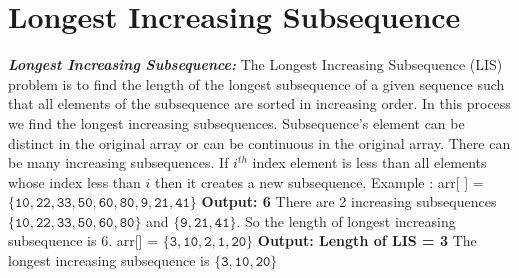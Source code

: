 \documentclass[12pt]{book}
\begin{document}
\section{Longest Increasing Subsequence}
\textbf{\textit{Longest Increasing Subsequence:}}
\newline\newline
The Longest Increasing Subsequence (LIS) problem is to find the length of the longest subsequence of a given sequence such that all elements of the subsequence are sorted in increasing order.\newline 
In this process we find the longest increasing subsequences. Subsequence’s element can be distinct in the original array or can be continuous in the original array. There can be many increasing subsequences. If $i^{th}$ index element is less than all elements whose index less than $i$ then it creates a new subsequence.\newline
Example :\newline
arr[ ] = $\mathtt{\{ 10, 22, 33, 50, 60, 80, 9, 21, 41\}}$\newline
	\textbf{Output: 6}\newline
		There are 2 increasing subsequences $\mathtt{\{ 10, 22, 33, 50, 60, 80\}}$  and $\mathtt{\{9, 21, 41\}}$. So the length of longest increasing subsequence is 6.\newline\newline 
	arr[] = $\mathtt{\{ 3, 10, 2, 1, 20 \}}$\newline
	\textbf{Output: Length of LIS = 3}\newline
	The longest increasing subsequence is $\mathtt{\{ 3, 10, 20\}}$\newline\newline
\end{document}
